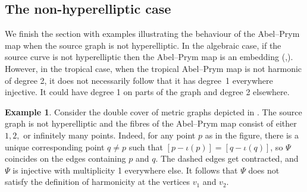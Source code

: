 \documentclass[11pt]{article}
\theoremstyle{definition}
\newtheorem{exam}[theo]{Example}
\numberwithin{equation}{section}
\theoremstyle{definition}
\begin{document}
\subsection{The non-hyperelliptic case}
We finish the section with   examples  illustrating the behaviour of the Abel--Prym map when the source graph is not hyperelliptic. 
In the algebraic case, if the source curve is not hyperelliptic then the Abel--Prym map is an embedding (\cite{BL04},\cite{LZ22}).
However, in the tropical case, when the tropical Abel--Prym map is not harmonic of degree 2, it does not necessarily follow that it has degree~1 everywhere injective. It could have degree 1 on parts of the graph and degree 2 elsewhere.

\begin{exam}\label{ex:hyperellipticType}
Consider the double cover of metric graphs depicted in . The source graph is not hyperelliptic and the fibres of the Abel--Prym map consist of either  $1,2,$ or infinitely many points. Indeed, for any point $p$ as in the figure, there is a unique corresponding point $q\neq p$ such that $[p-\iota(p)] = [q-\iota(q)]$, so $\Psi$ coincides on the edges containing $p$ and $q$. The dashed edges get contracted, and $\Psi$ is injective with multiplicity 1 everywhere else. It follows that $\Psi$ does not satisfy the definition of harmonicity at the vertices $v_1$ and $v_2$.  

 
    \begin{figure}[ht]
    \centering
{}
\end{figure}
\end{exam}
\end{document}
